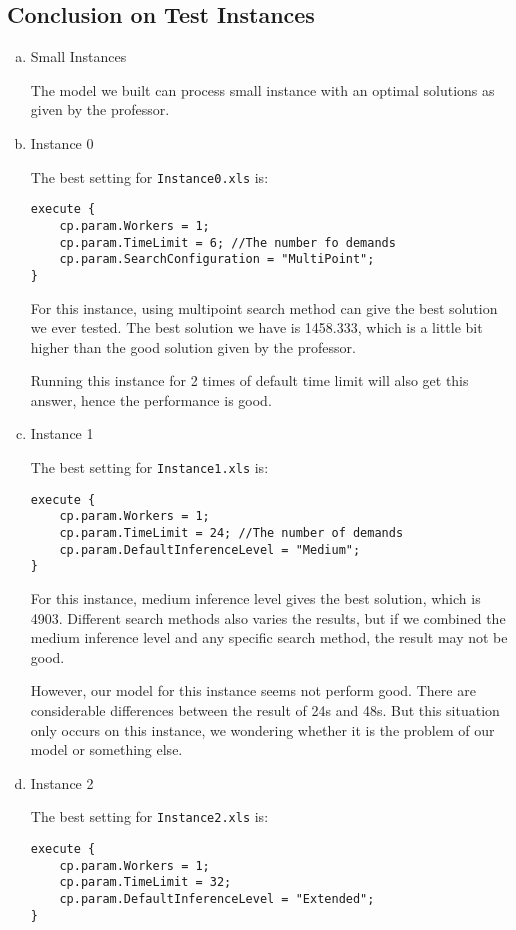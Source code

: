 \documentclass[a4paper, 12pt]{article}
\begin{document}
\subsection{Conclusion on Test Instances}
\begin{enumerate}[a.~]
\item Small Instances

The model we built can process small instance with an optimal solutions as given by the professor. 

\item Instance 0

The best setting for \texttt{Instance0.xls} is: 
\begin{lstlisting}
execute {
    cp.param.Workers = 1;
    cp.param.TimeLimit = 6; //The number fo demands
    cp.param.SearchConfiguration = "MultiPoint";
}
\end{lstlisting}

For this instance, using multipoint search method can give the best solution we ever tested. The best solution we have is 1458.333, which is a little bit higher than the good solution given by the professor. 

Running this instance for 2 times of default time limit will also get this answer, hence the performance is good. 
\item Instance 1

The best setting for \texttt{Instance1.xls} is: 

\begin{lstlisting}
execute {
    cp.param.Workers = 1;
    cp.param.TimeLimit = 24; //The number of demands
    cp.param.DefaultInferenceLevel = "Medium";
}
\end{lstlisting}

For this instance, medium inference level gives the best solution, which is 4903. Different search methods also varies the results, but if we combined the medium inference level and any specific search method, the result may not be good. 

However, our model for this instance seems not perform good. There are considerable differences between the result of 24s and 48s. But this situation only occurs on this instance, we wondering whether it is the problem of our model or something else. 

\item Instance 2

The best setting for \texttt{Instance2.xls} is: 

\begin{lstlisting}
execute {
    cp.param.Workers = 1;
    cp.param.TimeLimit = 32; 
    cp.param.DefaultInferenceLevel = "Extended";
}
\end{lstlisting}


\end{enumerate}
\end{document}
